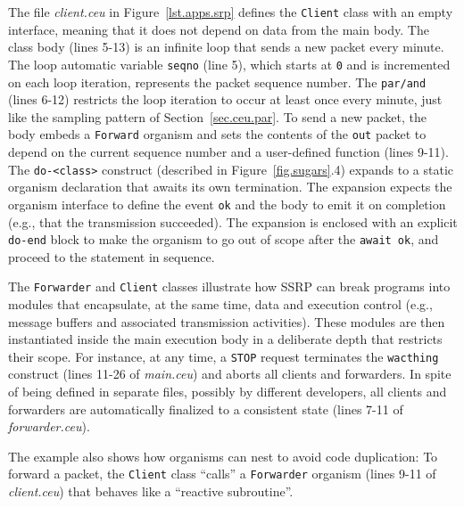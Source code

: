 \documentclass{sigplanconf}
\newcommand{\CEU}{\textsc{C\'{e}u}\xspace}
\newcommand{\code}[1] {{\small{\texttt{#1}}}}
\newcommand{\1}{\;}
\newcommand{\2}{\;\;}
\newcommand{\3}{\;\;\;}
\newcommand{\5}{\;\;\;\;\;}
\begin{document}
The file \emph{client.ceu} in Figure~\ref{lst.apps.srp} defines the 
\code{Client} class with an empty interface, meaning that it does not depend on 
data from the main body.
%
The class body (lines 5-13) is an infinite loop that sends a new packet
every minute.
The loop automatic variable \code{seqno} (line 5), which starts at \code{0} and 
is incremented on each loop iteration, represents the packet sequence number.
%
The \code{par/and} (lines 6-12) restricts the loop iteration to occur at least 
once every minute, just like the sampling pattern of Section~\ref{sec.ceu.par}.
%
To send a new packet, the body embeds a \code{Forward} organism and sets the 
contents of the \code{out} packet to depend on the current sequence number and 
a user-defined function (lines 9-11).
The \code{do-<class>} construct (described in Figure~\ref{fig.sugars}.4) 
expands to a static organism declaration that awaits its own termination.
%
The expansion expects the organism interface to define the event \code{ok} and 
the body to emit it on completion (e.g., that the transmission succeeded).
The expansion is enclosed with an explicit \code{do-end} block to make the 
organism to go out of scope after the \code{await ok}, and proceed to the 
statement in sequence.

The \code{Forwarder} and \code{Client} classes illustrate how SSRP can break 
programs into modules that encapsulate, at the same time, data and execution 
control (e.g., message buffers and associated transmission activities).
%
These modules are then instantiated inside the main execution body in a 
deliberate depth that restricts their scope.
%
For instance, at any time, a \code{STOP} request terminates the \code{wacthing} 
construct (lines 11-26 of \emph{main.ceu}) and aborts all clients and 
forwarders.
%
In spite of being defined in separate files, possibly by different developers, 
all clients and forwarders are automatically finalized to a consistent state 
(lines 7-11 of \emph{forwarder.ceu}).

The example also shows how organisms can nest to avoid code duplication:
To forward a packet, the \code{Client} class ``calls'' a \code{Forwarder} 
organism (lines 9-11 of \emph{client.ceu}) that behaves like a ``reactive 
subroutine''.

\end{document}
